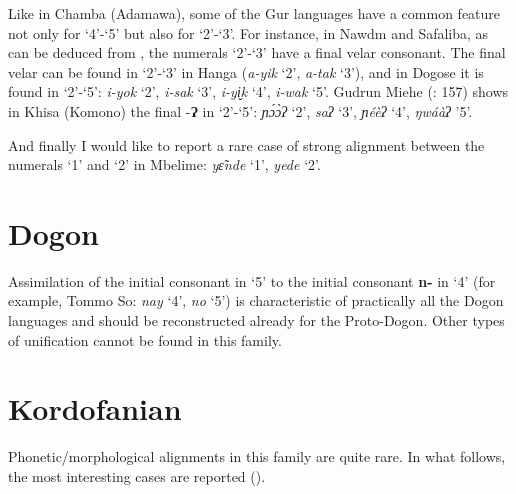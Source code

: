 Like in Chamba (Adamawa), some of the Gur languages have a common feature not only for ‘4’-‘5’ but also for ‘2’-‘3’. For instance, in Nawdm and Safaliba, as can be deduced from , the numerals ‘2’-‘3’ have a final velar consonant. The final velar can be found in ‘2’-‘3’ in Hanga (\textit{a-yik} ‘2’, \textit{a-tak} ‘3’), and in Dogose it is found in ‘2’-‘5’: \textit{i-yok} ‘2’, \textit{i-sak} ‘3’, \textit{i-yi̬k} ‘4’, \textit{i-wak} ‘5’. Gudrun Miehe (\citealt{MieheEtAl2007}: 157) shows in Khisa (Komono) the final -\textbf{Ɂ} in ‘2’-‘5’: \textit{ɲ{\'{ɔ}}{\`{ɔ}}ʔ} ‘2’, \textit{s{}aʔ} ‘3’, \textit{ɲéèʔ} ‘4’, \textit{ŋwáàʔ} ’5’.

And finally I would like to report a rare case of strong alignment between the numerals ‘1’ and ‘2’ in Mbelime: \textit{y{\~{ɛ}}nde} ‘1’, \textit{yede} ‘2’.

 
\section{Dogon}%

Assimilation of the initial consonant in ‘5’ to the initial consonant \textbf{n-} in ‘4’ (for example, Tommo So: \textit{nay} ‘4’, \textit{no} ‘5’) is characteristic of practically all the Dogon languages and should be reconstructed already for the Proto-Dogon. Other types of unification cannot be found in this family. 

 
\section{Kordofanian}%

Phonetic/morphological alignments in this family are quite rare. In what follows, the most interesting cases are reported ().

